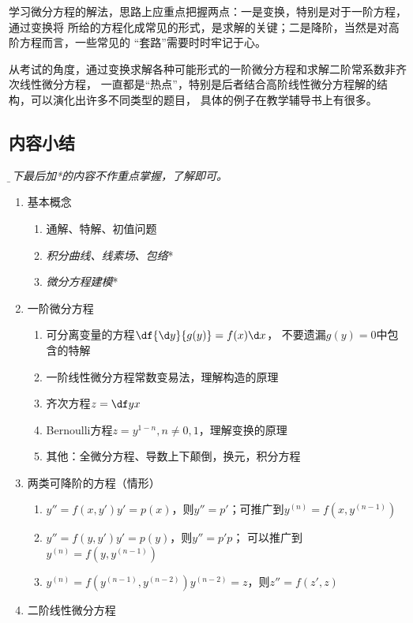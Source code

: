 学习微分方程的解法，思路上应重点把握两点：一是变换，特别是对于一阶方程，通过变换将
所给的方程化成常见的形式，是求解的关键；二是降阶，当然是对高阶方程而言，一些常见的
“套路”需要时时牢记于心。

从考试的角度，通过变换求解各种可能形式的一阶微分方程和求解二阶常系数非齐次线性微分方程，
一直都是“热点”，特别是后者结合高阶线性微分方程解的结构，可以演化出许多不同类型的题目，
具体的例子在教学辅导书上有很多。

\subsection{内容小结}

{\it\b 以下最后加*的内容不作重点掌握，了解即可。}

\begin{enumerate}[1.]
  \item 基本概念
  \begin{enumerate}[(1)]
    \item 通解、特解、初值问题
    \item {\it 积分曲线、线素场、包络}*
    \item {\it 微分方程建模}*
  \end{enumerate}
  \item 一阶微分方程
  \begin{enumerate}[(1)]
    \item 可分离变量的方程\dotfill$\df{\d y}{g(y)}=f(x)\d x$，
    不要遗漏$g(y)=0$中包含的特解
    \item 一阶线性微分方程\dotfill 常数变易法，理解构造的原理
    \item 齐次方程\dotfill$z=\df yx$
    \item Bernoulli方程\dotfill$z=y^{1-n},n\ne0,1$，理解变换的原理
    \item 其他：全微分方程、导数上下颠倒，换元，积分方程
  \end{enumerate}
  \item 两类可降阶的方程（情形）
  \begin{enumerate}[(1)]
    \item $y''=f(x,y')$$y'=p(x)$，则$y''=p'$；可推广到$y^{(n)}=f(x,y^{(n-1)})$
    \item $y''=f(y,y')$\dotfill$y'=p(y)$，则$y''=p'p$；
    可以推广到$y^{(n)}=f(y,y^{(n-1)})$
    \item $y^{(n)}=f(y^{(n-1)},y^{(n-2)})$\dotfill$y^{(n-2)}=z$，则$z''=f(z',z)$
  \end{enumerate}
  \item 二阶线性微分方程

\end{enumerate}
